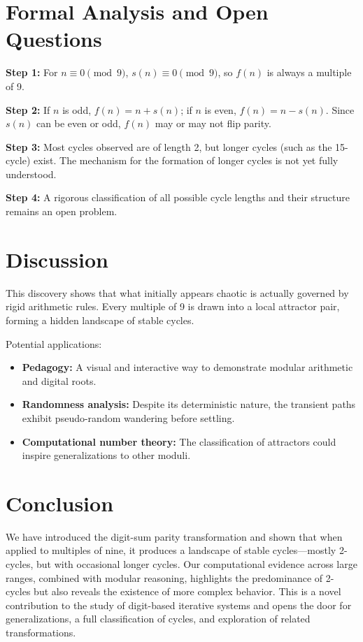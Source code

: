 \documentclass[12pt]{article}
\begin{document}
\section{Formal Analysis and Open Questions}
\textbf{Step 1:} For $n \equiv 0 \pmod{9}$, $s(n) \equiv 0 \pmod{9}$, so $f(n)$ is always a multiple of 9.

\textbf{Step 2:} If $n$ is odd, $f(n) = n + s(n)$; if $n$ is even, $f(n) = n - s(n)$. Since $s(n)$ can be even or odd, $f(n)$ may or may not flip parity.

\textbf{Step 3:} Most cycles observed are of length 2, but longer cycles (such as the 15-cycle) exist. The mechanism for the formation of longer cycles is not yet fully understood.

\textbf{Step 4:} A rigorous classification of all possible cycle lengths and their structure remains an open problem.

\section{Discussion}
This discovery shows that what initially appears chaotic is actually governed by rigid arithmetic rules. Every multiple of 9 is drawn into a local attractor pair, forming a hidden landscape of stable cycles.

Potential applications:
\begin{itemize}
    \item \textbf{Pedagogy:} A visual and interactive way to demonstrate modular arithmetic and digital roots.
    \item \textbf{Randomness analysis:} Despite its deterministic nature, the transient paths exhibit pseudo-random wandering before settling.
    \item \textbf{Computational number theory:} The classification of attractors could inspire generalizations to other moduli.
\end{itemize}

\section{Conclusion}
We have introduced the digit-sum parity transformation and shown that when applied to multiples of nine, it produces a landscape of stable cycles---mostly 2-cycles, but with occasional longer cycles. Our computational evidence across large ranges, combined with modular reasoning, highlights the predominance of 2-cycles but also reveals the existence of more complex behavior. This is a novel contribution to the study of digit-based iterative systems and opens the door for generalizations, a full classification of cycles, and exploration of related transformations.
\end{document}
